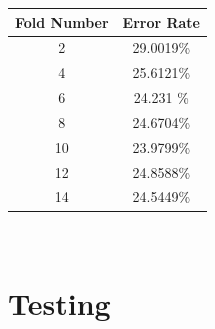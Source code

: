 \documentclass[a4paper,11pt]{article}
\begin{document}
\vspace{0.5cm}
\begin{tabular}{c c}
Fold Number & Error Rate\\
\hline \hline
2  &29.0019\%\\
4  &25.6121\%\\
6  &24.231 \%\\
8  & 24.6704\%\\
10 & 23.9799\%\\
12 & 24.8588\%\\
14 & 24.5449\%\\
\end{tabular}
\vspace{0.5cm}\\
\section{Testing}
\end{document}
